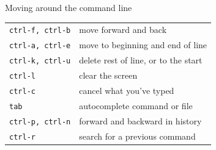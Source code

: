 \documentclass[12pt,t]{beamer}
\begin{document}
\begin{frame}[c]{Moving around the command line}

\renewcommand{\arraystretch}{1.3}
\begin{tabular}{ll}
{\tt ctrl-f, ctrl-b} & \color{lolit} move forward and back \\
{\tt ctrl-a, ctrl-e} & \color{lolit}  move to beginning and end of line \\
{\tt ctrl-k, ctrl-u} & \color{lolit}  delete rest of line, or to the start \\
{\tt ctrl-l} & \color{lolit}  clear the screen \\
{\tt ctrl-c} & \color{lolit}  cancel what you've typed \\
{\tt tab} & \color{lolit}  autocomplete command or file \\
{\tt ctrl-p, ctrl-n} & \color{lolit}  forward and backward in history \\
{\tt ctrl-r} & \color{lolit}  search for a previous command
\end{tabular}

\end{frame}
\end{document}
